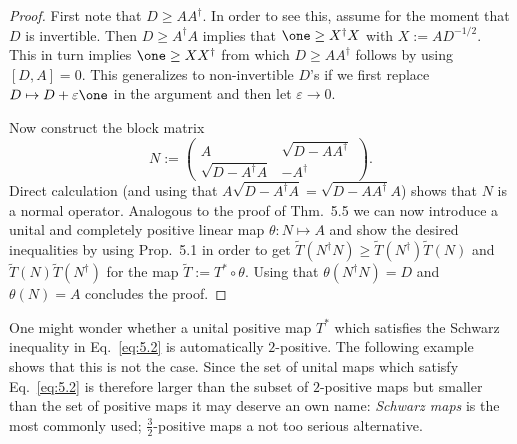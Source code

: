 \documentclass[11pt,a4paper]{article}
\theoremstyle{plain}
\theoremstyle{definition}
\theoremstyle{remark}
\numberwithin{equation}{section}
\begin{document}
\begin{proof}
    First note that $D\ge AA^\dagger$. In order to see this, assume for the moment that
    $D$ is invertible. Then $D\ge A^\dagger A$ implies that $\one \ge X^\dagger X$ with
    $X:=AD^{-1/2}$. This in turn implies $\one \ge XX^\dagger$ from which
    $D\ge AA^\dagger$ follows by using $[D,A]=0$. This generalizes to non-invertible $D$'s
    if we first replace $D\mapsto D+\varepsilon \one$ in the argument and then let
    $\varepsilon \to 0$.

    Now construct the block matrix
    \[
        N :=
        \begin{pmatrix}
            A                    &\sqrt{D-AA^\dagger}\\
            \sqrt{D-A^\dagger A} &-A^\dagger
        \end{pmatrix}.
    \]
    Direct calculation (and using that $A\sqrt{D-A^\dagger A}=\sqrt{D-AA^\dagger}A$)
    shows that $N$ is a normal operator. Analogous to the proof of Thm.~5.5 we can now
    introduce a unital and completely positive linear map $\theta:N\mapsto A$ and show
    the desired inequalities by using Prop.~5.1 in order to get
    $\widetilde T(N^\dagger N)\ge \widetilde T(N^\dagger)\widetilde T(N)$ and
    $\widetilde T(N)\widetilde T(N^\dagger)$ for the map $\widetilde T:=T^*\circ \theta$.
    Using that $\theta(N^\dagger N)=D$ and $\theta(N)=A$ concludes the proof.
\end{proof}

One might wonder whether a unital positive map $T^*$ which satisfies the Schwarz
inequality in Eq.~\eqref{eq:5.2} is automatically $2$-positive. The following example
shows that this is not the case. Since the set of unital maps which satisfy
Eq.~\eqref{eq:5.2} is therefore larger than the subset of $2$-positive maps but
smaller than the set of positive maps it may deserve an own name: \emph{Schwarz maps}
is the most commonly used; $\tfrac32$-positive maps a not too serious alternative.
\end{document}
